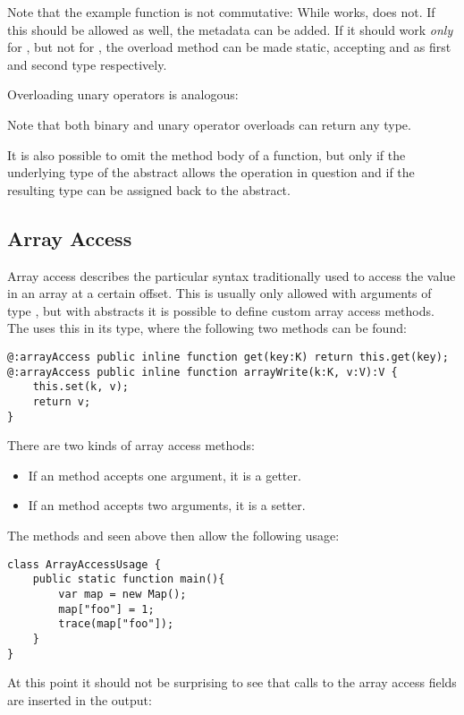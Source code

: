 \documentclass{haxe}
\begin{document}
Note that the example  function is not commutative: While  works,  does not. If this should be allowed as well, the  metadata can be added. If it should work \emph{only} for , but not for , the overload method can be made static, accepting  and  as first and second type respectively.

Overloading unary operators is analogous:

Note that both binary and unary operator overloads can return any type.

It is also possible to omit the method body of a  function, but only if the underlying type of the abstract allows the operation in question and if the resulting type can be assigned back to the abstract.


\subsection{Array Access}
\label{types-abstract-array-access}

Array access describes the particular syntax traditionally used to access the value in an array at a certain offset. This is usually only allowed with arguments of type , but with abstracts it is possible to define custom array access methods. The  uses this in its  type, where the following two methods can be found:

\begin{lstlisting}
@:arrayAccess public inline function get(key:K) return this.get(key);
@:arrayAccess public inline function arrayWrite(k:K, v:V):V {
	this.set(k, v);
	return v;
}
\end{lstlisting}
There are two kinds of array access methods:

\begin{itemize}
	\item If an  method accepts one argument, it is a getter.
	\item If an  method accepts two arguments, it is a setter.
\end{itemize}
The methods  and  seen above then allow the following usage:

\begin{lstlisting}
class ArrayAccessUsage {
	public static function main(){
		var map = new Map();
		map["foo"] = 1;
		trace(map["foo"]);
	}
}
\end{lstlisting}
At this point it should not be surprising to see that calls to the array access fields are inserted in the output:
\end{document}
